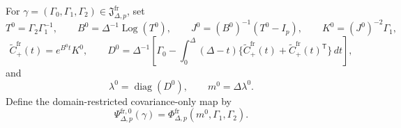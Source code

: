 For \(\gamma=(\Gamma_0,\Gamma_1,\Gamma_2)\in\mathfrak J_{\Delta,p}^{\mathrm{fr}}\), set
\[
 T^0=\Gamma_2\Gamma_1^{-1},\qquad
 B^0=\Delta^{-1}\operatorname{Log}(T^0),\qquad
 J^0=(B^0)^{-1}(T^0-I_p),\qquad
 K^0=(J^0)^{-2}\Gamma_1,
\]
\[
 \widetilde C_{+}^{\mathrm{fr}}(t)=e^{B^0t}K^0,\qquad
 D^0=\Delta^{-1}\!\left[
 \Gamma_0-\int_0^\Delta(\Delta-t)
 \{\widetilde C_{+}^{\mathrm{fr}}(t)
   +\widetilde C_{+}^{\mathrm{fr}}(t)^{\mathsf T}\}\,dt\right],
\]
and
\[
 \lambda^0=\operatorname{diag}(D^0),\qquad m^0=\Delta\lambda^0.
\]
Define the domain-restricted covariance-only map by
\[
 \Psi_{\Delta,p}^{\mathrm{fr},0}(\gamma)
 =\Phi_{\Delta,p}^{\mathrm{fr}}(m^0,\Gamma_1,\Gamma_2).
\]